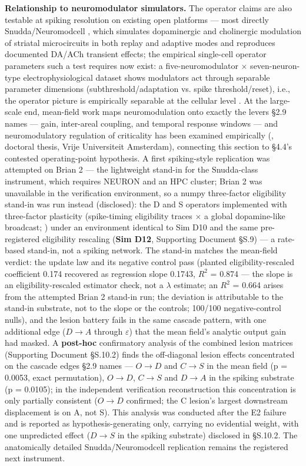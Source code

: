 \documentclass[11pt,twocolumn]{article}
\theoremstyle{plain}
\begin{document}
\textbf{Relationship to neuromodulator simulators.} The operator claims are also testable at spiking resolution on existing open platforms — most directly Snudda/Neuromodcell \citep{frostnylen2021}, which simulates dopaminergic and cholinergic modulation of striatal microcircuits in both replay and adaptive modes and reproduces documented DA/ACh transient effects; the empirical single-cell operator parameters such a test requires now exist: a five-neuromodulator $\times$ seven-neuron-type electrophysiological dataset shows modulators act through separable parameter dimensions (subthreshold/adaptation vs. spike threshold/reset), i.e., the operator picture is empirically separable at the cellular level \citep{guarino2025}. At the large-scale end, mean-field work maps neuromodulation onto exactly the levers \S{}2.9 names — gain, inter-areal coupling, and temporal response windows \citep{shine2021} — and neuromodulatory regulation of criticality has been examined empirically (\citealp{avramiea2023}, doctoral thesis, Vrije Universiteit Amsterdam), connecting this section to \S{}4.4's contested operating-point hypothesis. A first spiking-style replication was attempted on Brian 2 \citep{stimberg2019} — the lightweight stand-in for the Snudda-class instrument, which requires NEURON and an HPC cluster; Brian 2 was unavailable in the verification environment, so a numpy three-factor eligibility stand-in was run instead (disclosed): the D and S operators implemented with three-factor plasticity (spike-timing eligibility traces $\times$ a global dopamine-like broadcast; \citealp{izhikevich2007}) under an environment identical to Sim D10 and the same pre-registered eligibility rescaling (\textbf{Sim D12}, Supporting Document \S{}S.9) — a rate-based stand-in, not a spiking network. The stand-in matches the mean-field verdict: the update law and its negative control pass (planted eligibility-rescaled coefficient 0.174 recovered as regression slope 0.1743, $R^{2}$ = 0.874 — the slope is an eligibility-rescaled estimator check, not a $\lambda$ estimate; an $R^{2}$ = 0.664 arises from the attempted Brian 2 stand-in run; the deviation is attributable to the stand-in substrate, not to the slope or the controls; 100/100 negative-control nulls), and the lesion battery fails in the same cascade pattern, with one additional edge ($D{\to}A$ through $\varepsilon$) that the mean field's analytic output gain had masked. A \textbf{post-hoc} confirmatory analysis of the combined lesion matrices (Supporting Document \S{}S.10.2) finds the off-diagonal lesion effects concentrated on the cascade edges \S{}2.9 names — $O{\to}D$ and $C{\to}S$ in the mean field (p = 0.0053, exact permutation), $O{\to}D$, $C{\to}S$ and $D{\to}A$ in the spiking substrate (p = 0.0105); in the independent verification reconstruction this concentration is only partially consistent ($O{\to}D$ confirmed; the C lesion's largest downstream displacement is on A, not S). This analysis was conducted after the E2 failure and is reported as hypothesis-generating only, carrying no evidential weight, with one unpredicted effect ($D{\to}S$ in the spiking substrate) disclosed in \S{}S.10.2. The anatomically detailed Snudda/Neuromodcell replication remains the registered next instrument.
\end{document}
